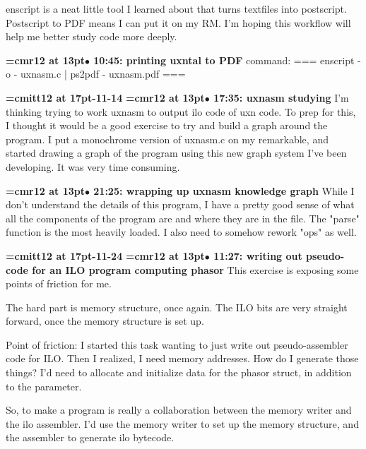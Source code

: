 enscript is a neat little tool I learned about that turns textfiles into postscript. Postscript to PDF means I can put it on my RM. I'm hoping this workflow will help me better study code more deeply.
\par

{\smallskip\noindent\bf\font\titlefont=cmr12 at 13pt\titlefont $\bullet$ 10:45: printing uxntal to PDF}\smallskip
command: === enscript -o - uxnasm.c | ps2pdf - uxnasm.pdf ===
\par

{\medskip\noindent\bf\font\titlefont=cmitt12 at 17pt-11-14}\medskip
{\smallskip\noindent\bf\font\titlefont=cmr12 at 13pt\titlefont $\bullet$ 17:35: uxnasm studying}\smallskip
I'm thinking trying to work uxnasm to output ilo code of uxn code. To prep for this, I thought it would be a good exercise to try and build a graph around the program. I put a monochrome version of uxnasm.c on my remarkable, and started drawing a graph of the program using this new graph system I've been developing. It was very time consuming.
\par

{\smallskip\noindent\bf\font\titlefont=cmr12 at 13pt\titlefont $\bullet$ 21:25: wrapping up uxnasm knowledge graph}\smallskip
While I don't understand the details of this program, I have a pretty good sense of what all the components of the program are and where they are in the file. The "parse" function is the most heavily loaded. I also need to somehow rework "ops" as well.
\par

{\medskip\noindent\bf\font\titlefont=cmitt12 at 17pt-11-24}\medskip
{\smallskip\noindent\bf\font\titlefont=cmr12 at 13pt\titlefont $\bullet$ 11:27: writing out pseudo-code for an ILO program computing phasor}\smallskip
This exercise is exposing some points of friction for me.
\par

The hard part is memory structure, once again. The ILO bits are very straight forward, once the memory structure is set up.
\par

Point of friction: I started this task wanting to just write out pseudo-assembler code for ILO. Then I realized, I need memory addresses. How do I generate those things? I'd need to allocate and initialize data for the phasor struct, in addition to the parameter.
\par

So, to make a program is really a collaboration between the memory writer and the ilo assembler. I'd use the memory writer to set up the memory structure, and the assembler to generate ilo bytecode.
\par

